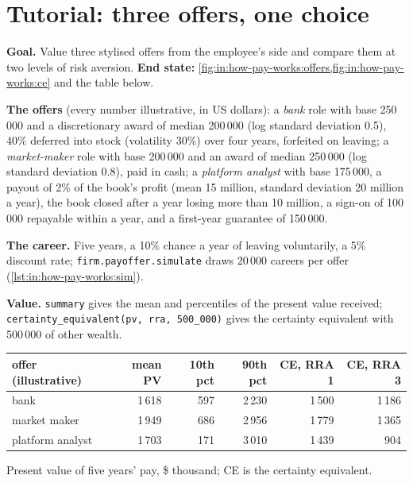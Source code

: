 \section{Tutorial: three offers, one choice}\label{tut:in:how-pay-works:tut}

\begin{tutorial}
\textbf{Goal.} Value three stylised offers from the employee's side and compare them at two levels of risk aversion.
\textbf{End state:} \cref{fig:in:how-pay-works:offers,fig:in:how-pay-works:ce} and the table below.
\begin{tutsteps}
\item \textbf{The offers} (every number illustrative, in US dollars): a \emph{bank} role with base 250\,000 and a
discretionary award of median 200\,000 (log standard deviation 0.5), 40\% deferred into stock (volatility 30\%) over four
years, forfeited on leaving; a \emph{market-maker} role with base 200\,000 and an award of median 250\,000 (log standard
deviation 0.8), paid in cash; a \emph{platform analyst} with base 175\,000, a payout of 2\% of the book's profit (mean
15 million, standard deviation 20 million a year), the book closed after a year losing more than 10 million, a sign-on of
100\,000 repayable within a year, and a first-year guarantee of 150\,000.
\item \textbf{The career.} Five years, a 10\% chance a year of leaving voluntarily, a 5\% discount rate;
\texttt{firm.payoffer.simulate} draws 20\,000 careers per offer (\cref{lst:in:how-pay-works:sim}).
\label{lst:in:how-pay-works:sim}
\item \textbf{Value.} \texttt{summary} gives the mean and percentiles of the present value received;
\texttt{certainty\_equivalent(pv, rra, 500\_000)} gives the certainty equivalent with 500\,000 of other wealth.
\end{tutsteps}
\end{tutorial}

\begin{center}\footnotesize
\begin{tabular}{@{}lrrrrr@{}}
\toprule
offer (illustrative) & mean PV & 10th pct & 90th pct & CE, RRA 1 & CE, RRA 3\\
\midrule
bank & 1\,618 & 597 & 2\,230 & 1\,500 & 1\,186\\
market maker & 1\,949 & 686 & 2\,956 & 1\,779 & 1\,365\\
platform analyst & 1\,703 & 171 & 3\,010 & 1\,439 & 904\\
\bottomrule
\end{tabular}

\smallskip Present value of five years' pay, \$ thousand; CE is the certainty equivalent.
\end{center}

